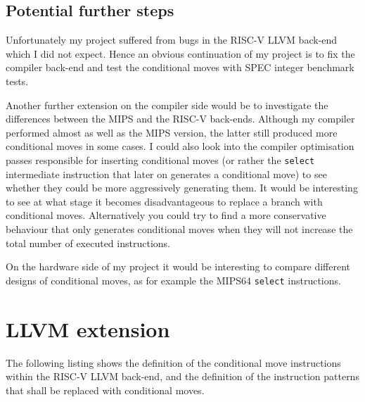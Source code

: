\documentclass[12pt,twoside,notitlepage]{report}
\begin{document}
\section{Potential further steps}

Unfortunately my project suffered from bugs in the RISC-V LLVM back-end which I did not expect. Hence an obvious continuation of my project is to fix the compiler back-end and test the conditional moves with SPEC integer benchmark tests. 

Another further extension on the compiler side would be to investigate the differences between the MIPS and the RISC-V back-ends. Although my compiler performed almost as well as the MIPS version, the latter still produced more conditional moves in some cases. I could also look into the compiler optimisation passes responsible for inserting conditional moves (or rather the \texttt{select} intermediate instruction that later on generates a conditional move) to see whether they could be more aggressively generating them. It would be interesting to see at what stage it becomes disadvantageous to replace a branch with conditional moves. Alternatively you could try to find a more conservative behaviour that only generates conditional moves when they will not increase the total number of executed instructions.

On the hardware side of my project it would be interesting to compare different designs of conditional moves, as for example the MIPS64 \texttt{select} instructions.


\cleardoublepage



%
\printbibliography
\cleardoublepage

\appendix

\chapter{LLVM extension}

The following listing shows the definition of the conditional move instructions within the RISC-V LLVM back-end, and the definition of the instruction patterns that shall be replaced with conditional moves. 
\end{document}
